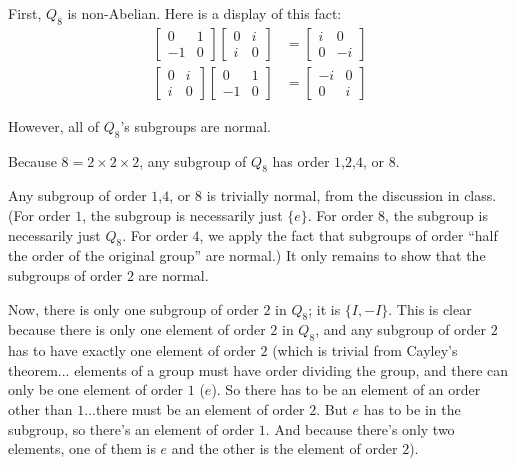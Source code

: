\documentclass[a4paper,12pt]{article}
\begin{document}
First, $Q_8$ is non-Abelian. Here is a display of this fact: 
\begin{align*}
\left[\begin{smallmatrix}0&1\\ -1&0 \end{smallmatrix}\right] \left[\begin{smallmatrix}0&i\\ i&0 \end{smallmatrix}\right] &= \left[\begin{smallmatrix}i&0\\ 0&-i \end{smallmatrix}\right] \\
\left[\begin{smallmatrix}0&i\\ i&0 \end{smallmatrix}\right] \left[\begin{smallmatrix}0&1\\ -1&0 \end{smallmatrix}\right] &= \left[\begin{smallmatrix}-i&0\\ 0&i \end{smallmatrix}\right]
\end{align*}

However, all of $Q_8$'s subgroups are normal.

Because $8 = 2 \times 2 \times 2$, any subgroup of $Q_8$ has order $1$,$2$,$4$, or $8$.

Any subgroup of order $1$,$4$, or $8$ is trivially normal, from the discussion in class. (For order $1$, the subgroup is necessarily just $\{e\}$. For order $8$, the subgroup is necessarily just $Q_8$. For order $4$, we apply the fact that subgroups of order ``half the order of the original group'' are normal.) It only remains to show that the subgroups of order $2$ are normal.

Now, there is only one subgroup of order $2$ in $Q_8$; it is $\{I, -I\}$. This is clear because there is only one element of order $2$ in $Q_8$, and any subgroup of order $2$ has to have exactly one element of order $2$ (which is trivial from Cayley's theorem... elements of a group must have order dividing the group, and there can only be one element of order $1$ ($e$). So there has to be an element of an order other than $1$...there must be an element of order $2$. But $e$ has to be in the subgroup, so there's an element of order $1$. And because there's only two elements, one of them is $e$ and the other is the element of order $2$).
\end{document}
